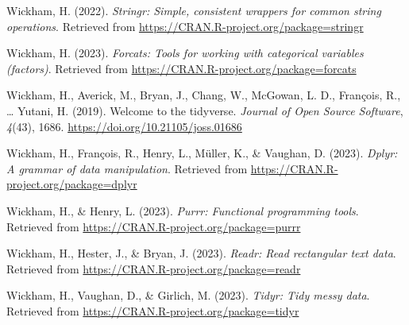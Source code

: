 \documentclass[
  man,floatsintext]{apa6}
\newlength{\cslhangindent}
\newlength{\cslentryspacingunit} %
\newenvironment{CSLReferences}[2] %
 {%
  \setlength{\parindent}{0pt}
  \ifodd #1
  \let\oldpar\par
  \def\par{\hangindent=\cslhangindent\oldpar}
  \fi
  \setlength{\parskip}{#2\cslentryspacingunit}
 }%
 {}
\begin{document}
\begin{CSLReferences}{1}{0}
\leavevmode{}%
Wickham, H. (2022). \emph{Stringr: Simple, consistent wrappers for common string operations}. Retrieved from \url{https://CRAN.R-project.org/package=stringr}

\leavevmode{}%
Wickham, H. (2023). \emph{Forcats: Tools for working with categorical variables (factors)}. Retrieved from \url{https://CRAN.R-project.org/package=forcats}

\leavevmode{}%
Wickham, H., Averick, M., Bryan, J., Chang, W., McGowan, L. D., François, R., \ldots{} Yutani, H. (2019). Welcome to the {tidyverse}. \emph{Journal of Open Source Software}, \emph{4}(43), 1686. \url{https://doi.org/10.21105/joss.01686}

\leavevmode{}%
Wickham, H., François, R., Henry, L., Müller, K., \& Vaughan, D. (2023). \emph{Dplyr: A grammar of data manipulation}. Retrieved from \url{https://CRAN.R-project.org/package=dplyr}

\leavevmode{}%
Wickham, H., \& Henry, L. (2023). \emph{Purrr: Functional programming tools}. Retrieved from \url{https://CRAN.R-project.org/package=purrr}

\leavevmode{}%
Wickham, H., Hester, J., \& Bryan, J. (2023). \emph{Readr: Read rectangular text data}. Retrieved from \url{https://CRAN.R-project.org/package=readr}

\leavevmode{}%
Wickham, H., Vaughan, D., \& Girlich, M. (2023). \emph{Tidyr: Tidy messy data}. Retrieved from \url{https://CRAN.R-project.org/package=tidyr}

\end{CSLReferences}
\end{document}
